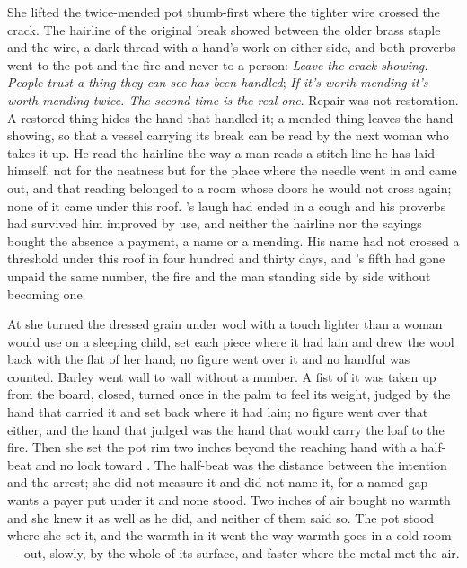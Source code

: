 She lifted the twice-mended pot thumb-first where the tighter wire crossed the crack. The hairline of the original break showed between the older brass staple and the wire, a dark thread with a hand's work on either side, and both proverbs went to the pot and the fire and never to a person: \emph{Leave the crack showing. People trust a thing they can see has been handled}; \emph{If it's worth mending it's worth mending twice. The second time is the real one}. Repair was not restoration. A restored thing hides the hand that handled it; a mended thing leaves the hand showing, so that a vessel carrying its break can be read by the next woman who takes it up. He read the hairline the way a man reads a stitch-line he has laid himself, not for the neatness but for the place where the needle went in and came out, and that reading belonged to a room whose doors he would not cross again; none of it came under this roof. 's laugh had ended in a cough and his proverbs had survived him improved by use, and neither the hairline nor the sayings bought the absence a payment, a name or a mending. His name had not crossed a threshold under this roof in four hundred and thirty days, and 's fifth had gone unpaid the same number, the fire and the man standing side by side without becoming one.

At  she turned the dressed grain under wool with a touch lighter than a woman would use on a sleeping child, set each piece where it had lain and drew the wool back with the flat of her hand; no figure went over it and no handful was counted. Barley went wall to wall without a number. A fist of it was taken up from the board, closed, turned once in the palm to feel its weight, judged by the hand that carried it and set back where it had lain; no figure went over that either, and the hand that judged was the hand that would carry the loaf to the fire. Then she set the pot rim two inches beyond the reaching hand with a half-beat and no look toward . The half-beat was the distance between the intention and the arrest; she did not measure it and did not name it, for a named gap wants a payer put under it and none stood. Two inches of air bought no warmth and she knew it as well as he did, and neither of them said so. The pot stood where she set it, and the warmth in it went the way warmth goes in a cold room --- out, slowly, by the whole of its surface, and faster where the metal met the air.

\scenebreak

